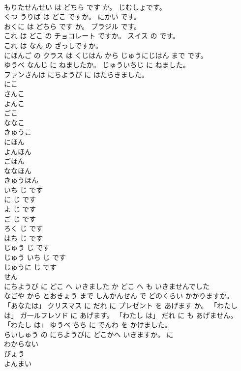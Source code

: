 \documentclass[8pt]{extreport}
\begin{document}
\begin{CJK}{UTF8}{min}
\\	もりたせんせい は どちら です か。 じむしょです。	
\\	くつ うりば は どこ ですか。 にかい です。	
\\	おくに は どちら です か。 ブラジル です。	
\\	これ は どこ の チョコレート ですか。 スイス の です。	
\\	これ は なん の ざっしですか。	
\\	にほんご の クラス は くじはん から じゅうにじはん まで です。	
\\	ゆうべ なんじ に ねましたか。 じゅういちじ に ねました。	
\\	ファンさんは にちようび に はたらきました。	
\\	にこ	
\\	さんこ	
\\	よんこ	
\\	ごこ	
\\	ななこ	
\\	きゅうこ	
\\	にほん	
\\	よんほん	
\\	ごほん	
\\	ななほん	
\\	きゅうほん	
\\	いち じ です	
\\	に じ です	
\\	よ じ です	
\\	ご じ です	
\\	ろく じ です	
\\	はち じ です	
\\	じゅう じ です	
\\	じゅう いち じ です	
\\	じゅうに じ です	
\\	せん	
\\	にちようび に どこ へ いきました か どこ へ も いきませんでした	
\\	なごや から とおきょう まで しんかんせん で どのくらい かかりますか。	
\\	「あなたは」 クリスマス に だれ に プレゼント を あげます か。 「わたし は」 ガ一ルフレソド に あげます。 「わたし は」 だれ に も あげません。	
\\	「わたし は」 ゆうべ ちち に でんわ を かけました。	
\\	らいしゅう の にちようびに どこかへ いきますか。	に 
\\	わからない	
\\	びょう	
\\	よんまい	

\end{CJK}
\end{document}
